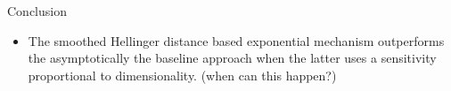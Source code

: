 \documentclass[final,hyperref={pdfpagelabels=false}]{beamer}
\begin{document}
\begin{frame}[t]
\begin{columns}[t]
\begin{column}{.485\textwidth}
\begin{block}{Conclusion}
\begin{itemize}
\item The smoothed Hellinger distance based exponential mechanism outperforms the asymptotically the baseline 
  approach  when the latter uses a sensitivity proportional to dimensionality.
  (when can this happen?)
    


\end{itemize}
\end{block}














\end{column}
\end{columns}
\end{frame}
\end{document}
